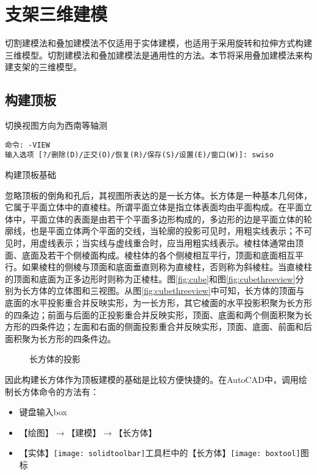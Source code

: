 \section{支架三维建模}

切割建模法和叠加建模法不仅适用于实体建模，也适用于采用旋转和拉伸方式构建三维模型。切割建模法和叠加建模法是通用性的方法。本节将采用叠加建模法来构建支架的三维模型。

\subsection{构建顶板}
\begin{procedure}
\item 切换视图方向为西南等轴测

\begin{lstlisting}
命令: -VIEW
输入选项 [?/删除(D)/正交(O)/恢复(R)/保存(S)/设置(E)/窗口(W)]: swiso
\end{lstlisting}

\item 构建顶板基础

忽略顶板的倒角和孔后，其视图所表达的是一长方体。长方体是一种基本几何体，它属于平面立体中的直棱柱。所谓平面立体是指立体表面均由平面构成。在平面立体中，平面立体的表面是由若干个平面多边形构成的，多边形的边是平面立体的轮廓线，也是平面立体两个平面的交线，当轮廓的投影可见时，用粗实线表示；不可见时，用虚线表示；当实线与虚线重合时，应当用粗实线表示。棱柱体通常由顶面、底面及若干个侧棱面构成。棱柱体的各个侧棱相互平行，顶面和底面相互平行。如果棱柱的侧棱与顶面和底面垂直则称为直棱柱，否则称为斜棱柱。当直棱柱的顶面和底面为正多边形时则称为正棱柱。图\ref{fig:cube}和图\ref{fig:cubethreeview}分别为长方体的立体图和三视图。从图\ref{fig:cubethreeview}中可知，长方体的顶面与底面的水平投影重合并反映实形，为一长方形，其它棱面的水平投影积聚为长方形的四条边；前面与后面的正投影重合并反映实形，顶面、底面和两个侧面积聚为长方形的四条件边；左面和右面的侧面投影重合并反映实形，顶面、底面、前面和后面积聚为长方形的四条件边。

\begin{figure}[htbp]
\centering
{}\hspace{30pt}
\caption{长方体的投影}
\end{figure}

因此构建长方体作为顶板建模的基础是比较方便快捷的。在AutoCAD中，调用绘制长方体命令的方法有：
\begin{itemize}
\item 键盘输入box
\item 【绘图】$\rightarrow $【建模】$\rightarrow $【长方体】
\item 【实体】\texttt{[image: solidtoolbar]}工具栏中的【长方体】\texttt{[image: boxtool]}图标
\end{itemize}


\end{procedure}
